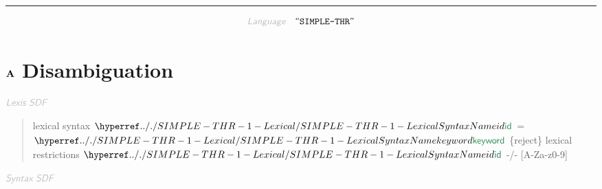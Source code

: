

\begin{center}
\rule{3in}{0.4pt}
\end{center}

\begin{displaymath}
\KEY{Language} \quad \STRING{SIMPLE-THR}
\end{displaymath}

\section{$\SECT{A}$ Disambiguation}\hypertarget{SectionNumber:A}{}\label{SectionNumber:A}

$\KEY{Lexis SDF}$

\begin{quote}
lexical syntax\newline
     $\SHADE{\SYNHYPER{../.}{SIMPLE-THR-1-Lexical}{id}}$ = $\SHADE{\SYNHYPER{../.}{SIMPLE-THR-1-Lexical}{keyword}}$ \{reject\}\newline
   \newline
   lexical restrictions\newline
     $\SHADE{\SYNHYPER{../.}{SIMPLE-THR-1-Lexical}{id}}$ -/- {[}A-Za-z0-9{]}
\end{quote}

$\KEY{Syntax SDF}$

